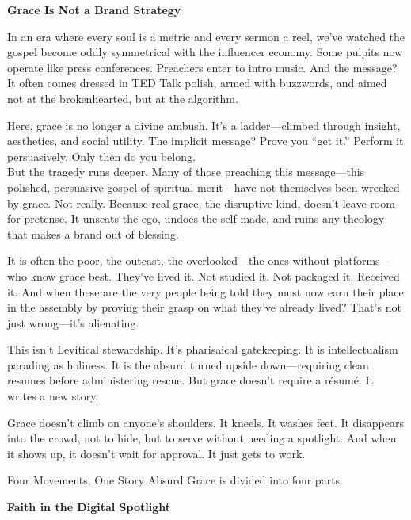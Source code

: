 \documentclass[a4paper,11pt]{book}
\begin{document}
\begin{center}
\textbf{Grace Is Not a Brand Strategy\\}
\end{center}

In an era where every soul is a metric and every sermon a reel, we’ve watched the gospel become oddly symmetrical with the influencer economy. Some pulpits now operate like press conferences. Preachers enter to intro music. And the message? It often comes dressed in TED Talk polish, armed with buzzwords, and aimed not at the brokenhearted, but at the algorithm.

Here, grace is no longer a divine ambush. It's a ladder—climbed through insight, aesthetics, and social utility. The implicit message? Prove you “get it.” Perform it persuasively. Only then do you belong.\\

But the tragedy runs deeper. Many of those preaching this message—this polished, persuasive gospel of spiritual merit—have not themselves been wrecked by grace. Not really. Because real grace, the disruptive kind, doesn’t leave room for pretense. It unseats the ego, undoes the self-made, and ruins any theology that makes a brand out of blessing.

It is often the poor, the outcast, the overlooked—the ones without platforms—who know grace best. They’ve lived it. Not studied it. Not packaged it. Received it. And when these are the very people being told they must now earn their place in the assembly by proving their grasp on what they’ve already lived? That’s not just wrong—it’s alienating.

This isn’t Levitical stewardship. It’s pharisaical gatekeeping. It is intellectualism parading as holiness. It is the absurd turned upside down—requiring clean resumes before administering rescue. But grace doesn’t require a résumé. It writes a new story.

Grace doesn’t climb on anyone’s shoulders. It kneels. It washes feet. It disappears into the crowd, not to hide, but to serve without needing a spotlight. And when it shows up, it doesn’t wait for approval. It just gets to work.

Four Movements, One Story
Absurd Grace is divided into four parts.

\begin{center}
\textbf{Faith in the Digital Spotlight\\}
\end{center}
\end{document}
